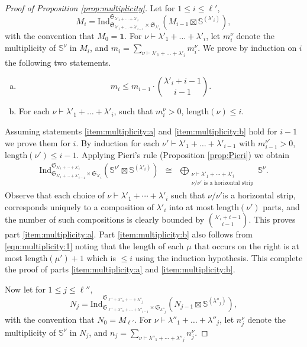 \documentclass{amsart}
\theoremstyle{definition}
\theoremstyle{remark}
\numberwithin{equation}{section}
\begin{document}
\begin{proof}[Proof of Proposition \ref{prop:multiplicity}]
Let for $1 \leq i \leq  \ell'$,
\[
M_i = {\mathrm{Ind}}_{\mathfrak{S}_{\lambda'_1 + \ldots +\lambda'_{i-1}} \times \mathfrak{S}_{\lambda'_i}}^{\mathfrak{S}_{\lambda'_1 + \ldots +\lambda'_{i}}}(M_{i-1}\boxtimes \mathbb{S}^{(\lambda'_i)}),
\]
with the convention that $M_0 = \mathbf{1}$.
For $\nu \vdash \lambda'_1 + \ldots +\lambda'_{i}$, let $m^\nu_i$ denote the multiplicity of 
$\mathbb{S}^\nu$ in $M_i$, and $m_i = \sum_{\nu \vdash \lambda'_1 + \ldots +\lambda'_{i}}  m^\nu_i$.
We prove by induction on $i$ the following two statements.
\begin{enumerate}[(a)]
\item
\label{item:multiplicity:a}
\[
m_i \leq m_{i-1} \cdot \binom{\lambda'_i+i-1}{i-1}.
\]
\item
\label{item:multiplicity:b}
For each $\nu \vdash \lambda'_1 + \ldots +\lambda'_{i}$, such that
$m^\nu_i > 0$, ${\mathrm{length}}(\nu) \leq i$.
\end{enumerate}

Assuming statements \eqref{item:multiplicity:a} and \eqref{item:multiplicity:b} hold for $i-1$ we prove them for $i$.
By induction for each $\nu' \vdash \lambda'_1 + \ldots +\lambda'_{i-1}$ with $m^{\nu'}_{i-1} > 0$,
${\mathrm{length}}(\nu') \leq i-1$. Applying Pieri's rule (Proposition \ref{prop:Pieri}) we obtain 
\begin{eqnarray}
\label{eqn:multiplicity:1}
{\mathrm{Ind}}_{\mathfrak{S}_{\lambda'_1+\cdots+\lambda'_{i-1}}\times \mathfrak{S}_{\lambda'_{i}}}^{\mathfrak{S}_{\lambda'_1+\cdots+\lambda'_i}} (\mathbb{S}^{\nu'} \boxtimes \mathbb{S}^{(\lambda'_i)}) 
&\cong& \bigoplus_{\substack{\nu \vdash \lambda'_1+\cdots+\lambda'_i \\ \nu/\nu' \mbox{ is a horizontal strip}}} \mathbb{S}^\nu.
\end{eqnarray}
Observe that each choice of $\nu \vdash \lambda'_1+\cdots+\lambda'_i$ such that  
$\nu/\nu'$is a horizontal strip, corresponds uniquely to a composition of $\lambda'_i$ into at most
${\mathrm{length}}(\nu')$ parts, and the number of such compositions is clearly bounded by 
$\binom{\lambda'_i+i-1}{i-1}$. This proves part \eqref{item:multiplicity:a}. 
Part \eqref{item:multiplicity:b} also follows from \eqref{eqn:multiplicity:1} noting that the length of each $\mu$ that occurs on the 
right is at most ${\mathrm{length}}(\mu')+1$ which is $\leq i$ using the induction hypothesis.
This complete the proof of parts \eqref{item:multiplicity:a}  and \eqref{item:multiplicity:b}.
 
Now let for $1 \leq j \leq  \ell''$,
\[
N_j = {\mathrm{Ind}}_{\mathfrak{S}_{\ell' + \lambda''_1 + \ldots +\lambda''_{i-1}} \times \mathfrak{S}_{\lambda''_j}}^{\mathfrak{S}_{\ell' + \lambda''_1 + \cdots +\lambda''_{j}}}(N_{j-1}\boxtimes \mathbb{S}^{(\lambda''_j)}),
\]
with the convention that $N_0 = M_{\ell'}$.
For $\nu \vdash \lambda''_1 + \ldots +\lambda''_{j}$, let $n^\nu_j$ denote the multiplicity of 
$\mathbb{S}^\nu$ in $N_j$, and $n_j = \sum_{\nu \vdash \lambda''_1 + \cdots +\lambda''_{j}}  n^\nu_j$.


\end{proof}
\end{document}
